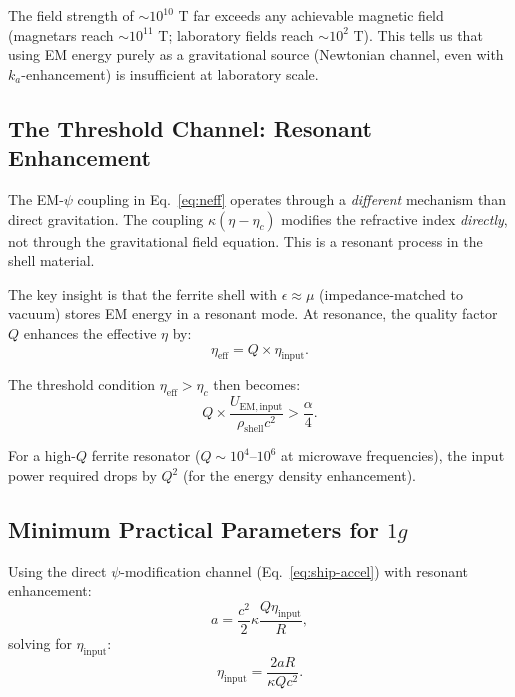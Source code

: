 \documentclass[12pt, letterpaper]{article}
\theoremstyle{definition}
\theoremstyle{remark}
\newcommand{\ka}{k_a}
\newcommand{\etac}{\eta_c}
\begin{document}
The field strength of $\sim 10^{10}$ T far exceeds any achievable magnetic
field (magnetars reach $\sim 10^{11}$ T; laboratory fields reach $\sim 10^2$ T).
This tells us that using EM energy purely as a gravitational source
(Newtonian channel, even with $\ka$-enhancement) is insufficient at
laboratory scale.

\subsection{The Threshold Channel: Resonant Enhancement}

The EM-$\psi$ coupling in Eq.~\eqref{eq:neff} operates through a
\emph{different} mechanism than direct gravitation. The coupling
$\kappa(\eta - \etac)$ modifies the refractive index \emph{directly},
not through the gravitational field equation. This is a resonant process
in the shell material.

The key insight is that the ferrite shell with $\epsilon \approx \mu$
(impedance-matched to vacuum) stores EM energy in a resonant mode. At
resonance, the quality factor $Q$ enhances the effective $\eta$ by:
\begin{equation}
\eta_{\mathrm{eff}} = Q \times \eta_{\mathrm{input}}.
\end{equation}

The threshold condition $\eta_{\mathrm{eff}} > \etac$ then becomes:
\begin{equation}
Q \times \frac{U_{\mathrm{EM,input}}}{\rho_{\mathrm{shell}} c^2} > \frac{\alpha}{4}.
\end{equation}

For a high-$Q$ ferrite resonator ($Q \sim 10^4$--$10^6$ at microwave
frequencies), the input power required drops by $Q^2$ (for the energy
density enhancement).

\subsection{Minimum Practical Parameters for $1g$}

Using the direct $\psi$-modification channel (Eq.~\ref{eq:ship-accel}) with
resonant enhancement:
\begin{equation}
a = \frac{c^2}{2} \kappa \frac{Q \eta_{\mathrm{input}}}{R},
\end{equation}
solving for $\eta_{\mathrm{input}}$:
\begin{equation}
\eta_{\mathrm{input}} = \frac{2aR}{\kappa Q c^2}.
\end{equation}
\end{document}
